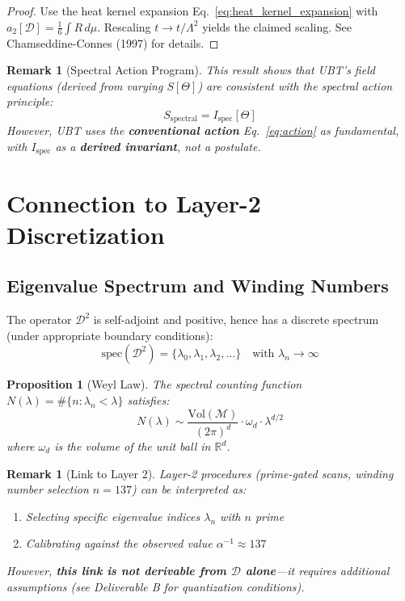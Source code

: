\documentclass[12pt]{article}
\newtheorem{proposition}[definition]{Proposition}
\newtheorem{remark}[definition]{Remark}
\newcommand{\R}{\mathbb{R}}
\newcommand{\M}{\mathcal{M}}
\newcommand{\spec}{\mathrm{spec}}
\begin{document}
\begin{proof}
Use the heat kernel expansion Eq.~\eqref{eq:heat_kernel_expansion} with $a_2[\mathcal{D}] = \frac{1}{6}\int R \, d\mu$. Rescaling $t \to t/\Lambda^2$ yields the claimed scaling. See Chamseddine-Connes (1997) for details.
\end{proof}

\begin{remark}[Spectral Action Program]
This result shows that UBT's field equations (derived from varying $S[\Theta]$) are consistent with the spectral action principle:
\begin{equation}
S_{\text{spectral}} = I_{\text{spec}}[\Theta]
\end{equation}
However, UBT uses the \textbf{conventional action} Eq.~\eqref{eq:action} as fundamental, with $I_{\text{spec}}$ as a \textbf{derived invariant}, not a postulate.
\end{remark}

\section{Connection to Layer-2 Discretization}

\subsection{Eigenvalue Spectrum and Winding Numbers}

The operator $\mathcal{D}^2$ is self-adjoint and positive, hence has a discrete spectrum (under appropriate boundary conditions):
\begin{equation}
\spec(\mathcal{D}^2) = \{\lambda_0, \lambda_1, \lambda_2, \ldots\} \quad \text{with } \lambda_n \to \infty
\end{equation}

\begin{proposition}[Weyl Law]
The spectral counting function $N(\lambda) = \#\{n : \lambda_n < \lambda\}$ satisfies:
\begin{equation}
N(\lambda) \sim \frac{\text{Vol}(\M)}{(2\pi)^d} \cdot \omega_d \cdot \lambda^{d/2}
\end{equation}
where $\omega_d$ is the volume of the unit ball in $\R^d$.
\end{proposition}

\begin{remark}[Link to Layer 2]
Layer-2 procedures (prime-gated scans, winding number selection $n=137$) can be interpreted as:
\begin{enumerate}
    \item Selecting specific eigenvalue indices $\lambda_n$ with $n$ prime
    \item Calibrating against the observed value $\alpha^{-1} \approx 137$
\end{enumerate}
However, \textbf{this link is not derivable from $\mathcal{D}$ alone}—it requires additional assumptions (see Deliverable B for quantization conditions).
\end{remark}
\end{document}
